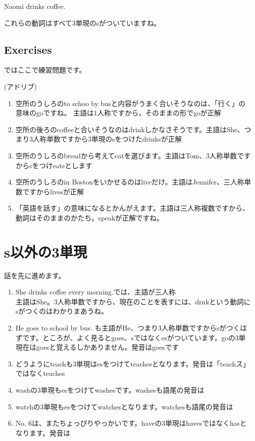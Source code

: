 \documentclass[book,jafontscale=0.9247]{jlreq}
\begin{document}
Naomi drinks coffee.

これらの動詞はすべて3単現のsがついていますね。

\subsection{Exercises}


ではここで練習問題です。

(アドリブ)


\begin{enumerate}
 \item 空所のうしろのto schoo by busと内容がうまく合いそうなのは、「行く」の意味のgoですね。
主語は1人称ですから，そのままの形でgoが正解
 \item 空所の後ろのcoffeeと合いそうなのはdrinkしかなさそうです。主語はShe、つまり3人称単数ですから3単現のsをつけたdrinksが正解
 \item 空所のうしろのbreadから考えてeatを選びます。主語はTom、3人称単数ですからsをつけeatsとします
 \item 空所のうしろのin Bostonをいかせるのはliveだけ。主語はJennifer、三人称単数ですからlivesが正解
 \item 「英語を話す」の意味になるとかんがえます。主語は三人称複数ですから、動詞はそのままのかたち。speakが正解ですね。
\end{enumerate}

\section{s以外の3単現}

話を先に進めます。

\begin{enumerate}
 \item She drinks coffee every morning.では、主語が三人称\\
主語はShe。3人称単数ですから、現在のことを表すには、drnkという動詞にsがつくのはわかりまあうね。
 \item He goes to school by bus. も主語がHe、つまり3人称単数ですからsがつくはずです。ところが、よく見るとgoes、sではなくesがついています。goの3単現在はgoesと覚えるしかありません。発音はgoesです
 \item どうようにteachも3単現はesをつけてteachesとなります。発音は「teachス」ではなくteaches
 \item washの3単現もesをつけてwashesです。washesも語尾の発音は
 \item watchの3単現もesをつけてwatchesとなります。watchesも語尾の発音は
 \item No. 6は、またちょっぴりやっかいです。haveの3単現はhavesではなくhasとなります。発音は
\end{enumerate}
\end{document}
